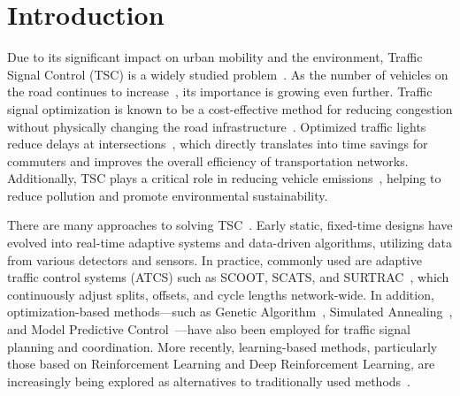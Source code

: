 \chapter*{Introduction}

%
%
%
%

Due to its significant impact on urban mobility and the environment, Traffic Signal Control (TSC) is a widely studied problem~\cite{zhao2012computational}. As the number of vehicles on the road continues to increase~\cite{caves2004encyclopedia}, its importance is growing even further.
Traffic signal optimization is known to be a cost-effective method for reducing congestion without physically changing the road infrastructure~\cite{wang2021traffic}.
Optimized traffic lights reduce delays at intersections~\cite{mu2022traffic}, which directly translates into time savings for commuters and improves the overall efficiency of transportation networks.
Additionally, TSC plays a critical role in reducing vehicle emissions~\cite{gunarathne2023traffic}, helping to reduce pollution and promote environmental sustainability.

There are many approaches to solving TSC~\cite{qadri2020state}. Early static, fixed-time designs have evolved into real-time adaptive systems and data-driven algorithms, utilizing data from various detectors and sensors. In practice, commonly used are adaptive traffic control systems (ATCS) such as SCOOT, SCATS, and SURTRAC~\cite{smith2013surtrac}, which continuously adjust splits, offsets, and cycle lengths network-wide. In addition, optimization-based methods---such as Genetic Algorithm~\cite{costa2020intersection}, Simulated Annealing~\cite{qadri2020state}, and Model Predictive Control~\cite{ye2019survey}---have also been employed for traffic signal planning and coordination. More recently, learning-based methods, particularly those based on Reinforcement Learning and Deep Reinforcement Learning, are increasingly being explored as alternatives to traditionally used methods~\cite{zhao2024survey, saadi2025survey}.


